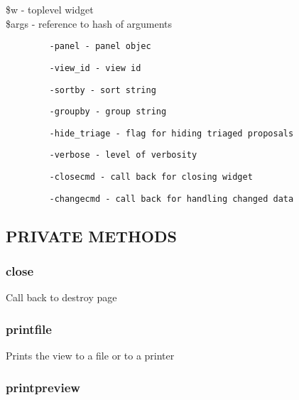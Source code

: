 \documentclass{article}
\begin{document}
\begin{description}

\item[{\$w - toplevel widget}] \mbox{}
\item[{\$args - reference to hash of arguments}] \mbox{}\begin{verbatim}
   -panel - panel objec
\end{verbatim}
\begin{verbatim}
   -view_id - view id
\end{verbatim}
\begin{verbatim}
   -sortby - sort string
\end{verbatim}
\begin{verbatim}
   -groupby - group string
\end{verbatim}
\begin{verbatim}
   -hide_triage - flag for hiding triaged proposals
\end{verbatim}
\begin{verbatim}
   -verbose - level of verbosity
\end{verbatim}
\begin{verbatim}
   -closecmd - call back for closing widget
\end{verbatim}
\begin{verbatim}
   -changecmd - call back for handling changed data
\end{verbatim}
\end{description}
\subsection*{PRIVATE METHODS\label{PrintPanel_PRIVATE_METHODS}}
\subsubsection*{close\label{PrintPanel_close}}


Call back to destroy page

\subsubsection*{printfile\label{PrintPanel_printfile}}


Prints the view to a file or to a printer

\subsubsection*{printpreview\label{PrintPanel_printpreview}}
\end{document}
